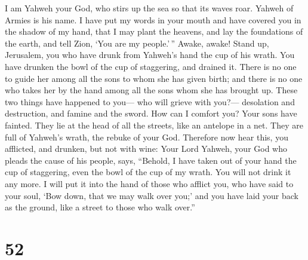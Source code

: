 I am Yahweh your God, who stirs up the sea so that its waves roar.
Yahweh of Armies is his name.  I have put my words in
your mouth and have covered you in the shadow of my hand, that I may
plant the heavens, and lay the foundations of the earth, and tell Zion,
`You are my people.'\,''  Awake, awake! Stand up,
Jerusalem, you who have drunk from Yahweh's hand the cup of his wrath.
You have drunken the bowl of the cup of staggering, and drained it.
 There is no one to guide her among all the sons to whom
she has given birth; and there is no one who takes her by the hand among
all the sons whom she has brought up.  These two things
have happened to you--- who will grieve with you?--- desolation and
destruction, and famine and the sword. How can I comfort you?
 Your sons have fainted. They lie at the head of all the
streets, like an antelope in a net. They are full of Yahweh's wrath, the
rebuke of your God.  Therefore now hear this, you
afflicted, and drunken, but not with wine:  Your Lord
Yahweh, your God who pleads the cause of his people, says, ``Behold, I
have taken out of your hand the cup of staggering, even the bowl of the
cup of my wrath. You will not drink it any more.  I will
put it into the hand of those who afflict you, who have said to your
soul, `Bow down, that we may walk over you;' and you have laid your back
as the ground, like a street to those who walk over.''

\hypertarget{section-49}{%
\section{52}\label{section-49}}

